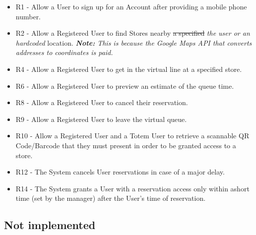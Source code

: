 \documentclass[
]{article}
\providecommand{\tightlist}{%
  \setlength{\itemsep}{0pt}\setlength{\parskip}{0pt}}
\begin{document}
\begin{itemize}
\tightlist
\item
  R1 - Allow a User to sign up for an Account after providing a mobile
  phone number.
\item
  R2 - Allow a Registered User to find Stores nearby \sout{a specified} \emph{the user or an hardcoded}
  location. \emph{\textbf{Note: }This is because the Google Maps API that converts addresses to coordinates is paid.}
\item
  R4 - Allow a Registered User to get in the virtual line at a
  specified store.
\item
  R6 - Allow a Registered User to preview an estimate of the queue time.
\item
  R8 - Allow a Registered User to cancel their reservation.
\item
  R9 - Allow a Registered User to leave the virtual queue.
\item
  R10 - Allow a Registered User and a Totem User to retrieve a
  scannable QR Code/Barcode that they must present in order to be
  granted access to a store.
\item
  R12 - The System cancels User reservations in case of a major delay.
\item
  R14 - The System grants a User with a reservation access only within
  ashort time (set by the manager) after the User's time of reservation.
\end{itemize}

\hypertarget{not-implemented}{%
\subsection{Not implemented}\label{not-implemented}}
\end{document}
